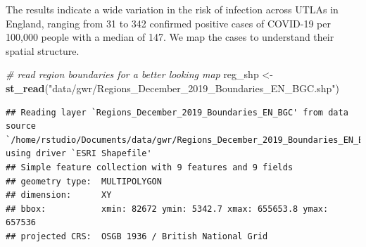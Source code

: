 \documentclass[
]{book}
\newenvironment{Shaded}{\begin{snugshade}}{\end{snugshade}}
\newcommand{\CommentTok}[1]{\textcolor[rgb]{0.56,0.35,0.01}{\textit{#1}}}
\newcommand{\KeywordTok}[1]{\textcolor[rgb]{0.13,0.29,0.53}{\textbf{#1}}}
\newcommand{\NormalTok}[1]{#1}
\newcommand{\StringTok}[1]{\textcolor[rgb]{0.31,0.60,0.02}{#1}}
\begin{document}
The results indicate a wide variation in the risk of infection across UTLAs in England, ranging from 31 to 342 confirmed positive cases of COVID-19 per 100,000 people with a median of 147. We map the cases to understand their spatial structure.

\begin{Shaded}
\begin{Highlighting}[]
\CommentTok{# read region boundaries for a better looking map}
\NormalTok{reg_shp <-}\StringTok{ }\KeywordTok{st_read}\NormalTok{(}\StringTok{"data/gwr/Regions_December_2019_Boundaries_EN_BGC.shp"}\NormalTok{)}
\end{Highlighting}
\end{Shaded}

\begin{verbatim}
## Reading layer `Regions_December_2019_Boundaries_EN_BGC' from data source `/home/rstudio/Documents/data/gwr/Regions_December_2019_Boundaries_EN_BGC.shp' using driver `ESRI Shapefile'
## Simple feature collection with 9 features and 9 fields
## geometry type:  MULTIPOLYGON
## dimension:      XY
## bbox:           xmin: 82672 ymin: 5342.7 xmax: 655653.8 ymax: 657536
## projected CRS:  OSGB 1936 / British National Grid
\end{verbatim}
\end{document}
